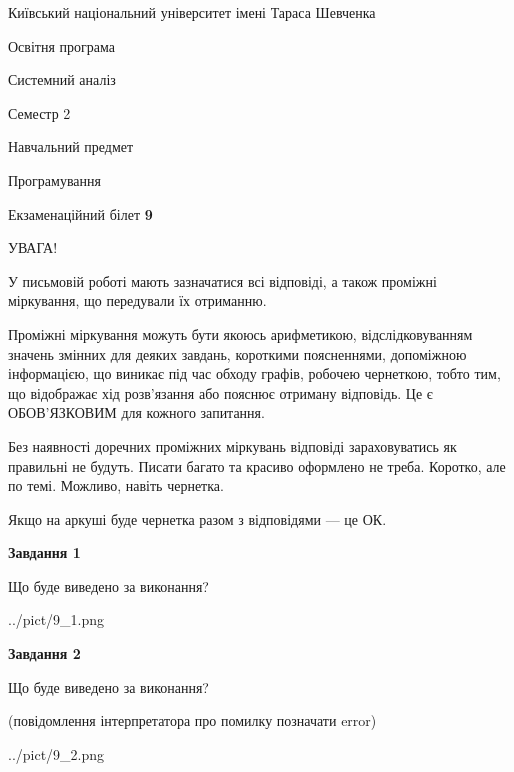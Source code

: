 \documentclass[12pt, ukrainian]{article}
\begin{document}
{{\begin {small}\par
{ \center  Київський національний університет імені Тараса Шевченка \par}
{\parbox {5 cm}{Освітня програма \hfill}{\parbox {7 cm}{Системний аналіз \hfill}}\parbox {6 cm}{\hfill Семестр 2}}\par
{\parbox {5 cm} {Навчальний предмет \hfill}\parbox {7 cm}{Програмування \hfill}\parbox {6cm}{\hfill}\par}\vspace{-7pt} \end{small}}{\center Екзаменаційний білет \No \textbf
{ 9 }\par}}
{
\begin {large}
УВАГА!

У письмовій роботі мають зазначатися всі відповіді, а також проміжні міркування, що передували їх отриманню.

Проміжні міркування можуть бути якоюсь арифметикою, відслідковуванням зна\-чень змінних для деяких завдань,
короткими поясненнями, допоміжною інформацією, що виникає під час обходу графів, робочею чернеткою,
тобто тим, що відображає хід розв’язання або пояснює отриману відповідь.
Це є ОБОВ’ЯЗКОВИМ для кожного запитання.

Без наявності доречних проміжних міркувань відповіді зараховуватись як правиль\-ні не будуть.
Писати багато та красиво оформлено не треба. Коротко, але по темі. Можли\-во, навіть чернетка.

Якщо на аркуші буде чернетка разом з відповідями --- це ОК.

\newpage

{\begin {center}\textbf{Завдання 1}\end {center}}\par
Що буде виведено за виконання?\par
\begin{center}
	{../pict/9_1.png}
\end{center}
\newpage

{\begin {center}\textbf{Завдання 2}\end {center}}\par
Що буде виведено за виконання?\par
 (повідомлення інтерпретатора про помилку позначати error)\par
\begin{center}
	{../pict/9_2.png}
\end{center}
\newpage


\end{large}}
\end{document}
